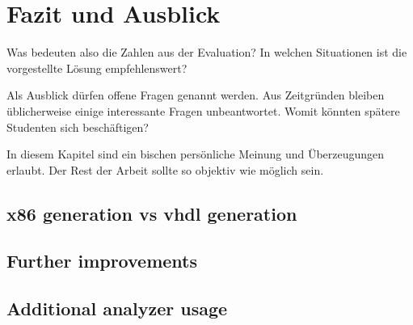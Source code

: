 \chapter{Fazit und Ausblick}\label{sec:conclusion}

Was bedeuten also die Zahlen aus der Evaluation?
In welchen Situationen ist die vorgestellte Lösung empfehlenswert?

Als Ausblick dürfen offene Fragen genannt werden.
Aus Zeitgründen bleiben üblicherweise einige interessante Fragen unbeantwortet.
Womit könnten spätere Studenten sich beschäftigen?

In diesem Kapitel sind ein bischen persönliche Meinung
und Überzeugungen erlaubt.
Der Rest der Arbeit sollte so objektiv wie möglich sein.

\section{x86 generation vs vhdl generation}

\section{Further improvements}

\section{Additional analyzer usage}